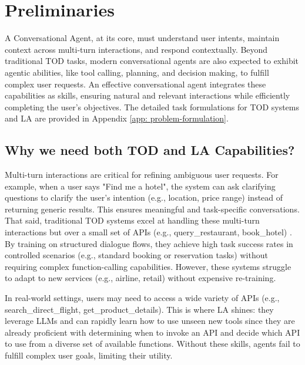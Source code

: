 


\section{Preliminaries}
A Conversational Agent, at its core, must understand user intents, maintain context across multi-turn interactions, and respond contextually. Beyond traditional TOD tasks, modern conversational agents are also expected to exhibit agentic abilities, like tool calling, planning, and decision making, to fulfill complex user requests. An effective conversational agent integrates these capabilities as skills, ensuring natural and relevant interactions while efficiently completing the user’s objectives. The detailed task formulations for TOD systems and LA are provided in Appendix \ref{app: problem-formulation}.

\vspace{-1ex}

\subsection{Why we need both TOD and LA Capabilities?}

Multi-turn interactions are critical for refining ambiguous user requests. For example, when a user says "Find me a hotel", the system can ask clarifying questions to clarify the user's intention (e.g., location, price range) instead of returning generic results. This ensures meaningful and task-specific conversations. That said, traditional TOD systems excel at handling these multi-turn interactions but over a small set of APIs (e.g., query\_restaurant, book\_hotel) \cite{ye-etal-2022-multiwoz}. By training on structured dialogue flows, they achieve high task success rates in controlled scenarios (e.g., standard booking or reservation tasks) without requiring complex function-calling capabilities. However, these systems struggle to adapt to new services (e.g., airline, retail) without expensive re-training. 

In real-world settings, users may need to access a wide variety of APIs (e.g., search\_direct\_flight, get\_product\_details). This is where LA shines: they leverage LLMs and can rapidly learn how to use unseen new tools since they are already proficient with determining when to invoke an API and decide which API to use from a diverse set of available functions. Without these skills, agents fail to fulfill complex user goals, limiting their utility. 

